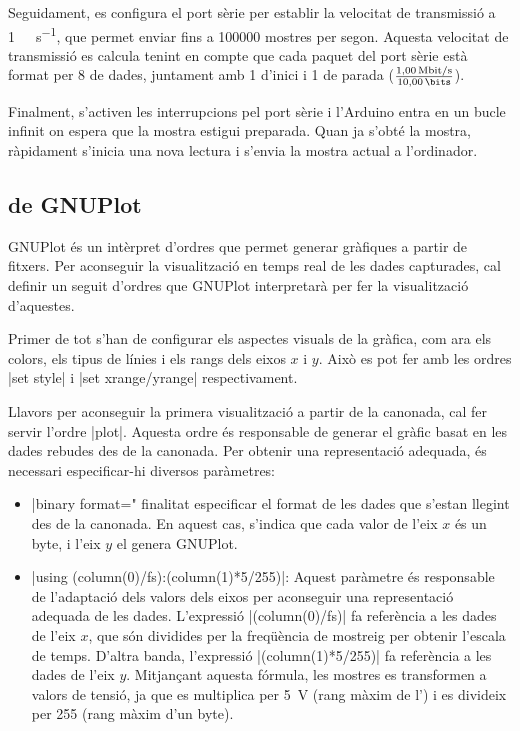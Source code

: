 \documentclass{tfgitic}[2023/07/07]
\begin{document}
Seguidament, es configura el port sèrie per establir la velocitat de
transmissió a \SI{1}{\mega\bit\per\second}, que permet enviar fins a
\num{100000} mostres per segon. Aquesta velocitat de transmissió es
calcula tenint en compte que cada paquet del port sèrie està format
per \SI{8}{\bits} de dades, juntament amb \SI{1}{\bit} d'inici i
\SI{1}{\bit} de parada ($\frac{\SI{1}{\mega\bit\per\second}}
{\SI{10}{\bits}}$).

Finalment, s'activen les interrupcions pel port sèrie i l'Arduino
entra en un bucle infinit on espera que la mostra estigui
preparada. Quan ja s'obté la mostra, ràpidament s'inicia una nova
lectura i s'envia la mostra actual a l'ordinador.

\subsection{ de GNUPlot}

GNUPlot és un intèrpret d'ordres que permet generar gràfiques a partir
de fitxers. Per aconseguir la visualització en temps real de les dades
capturades, cal definir un seguit d'ordres que GNUPlot interpretarà
per fer la visualització d'aquestes.

Primer de tot s'han de configurar els aspectes visuals de la gràfica,
com ara els colors, els tipus de línies i els rangs dels eixos $x$ i
$y$. Això es pot fer amb les ordres \ord|set style| i
\ord|set xrange/yrange| respectivament.

Llavors per aconseguir la primera visualització a partir de la
canonada, cal fer servir l'ordre \ord|plot|. Aquesta ordre és
responsable de generar el gràfic basat en les dades rebudes des de la
canonada. Per obtenir una representació adequada, és necessari
especificar-hi diversos paràmetres:

\begin{itemize}
	\item \ord|binary format="%
          finalitat especificar el format de les dades que s'estan
          llegint des de la canonada. En aquest cas, s'indica que cada
          valor de l'eix $x$ és un byte, i l'eix $y$ el genera
          GNUPlot.
	\item \ord|using (column(0)/fs):(column(1)*5/255)|: Aquest
          paràmetre és responsable de l'adaptació dels valors dels
          eixos per aconseguir una representació adequada de les
          dades. L'expressió \ord|(column(0)/fs)| fa referència a les
          dades de l'eix $x$, que són dividides per la freqüència de
          mostreig per obtenir l'escala de temps. D'altra banda,
          l'expressió \ord|(column(1)*5/255)| fa referència a les
          dades de l'eix $y$. Mitjançant aquesta fórmula, les mostres
          es transformen a valors de tensió, ja que es multiplica per
          \SI{5}{\V} (rang màxim de l') i es divideix per
          \num{255} (rang màxim d'un byte).
\end{itemize}
\end{document}
